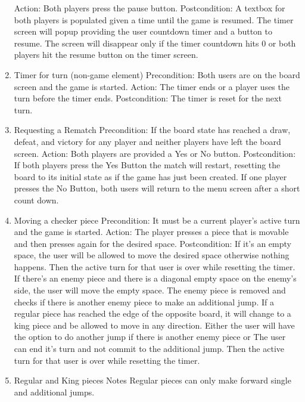 \documentclass[10pt]{article}
\begin{document}
\begin{enumerate}
        \subitem Action: Both players press the pause button.
        \subitem Postcondition: A textbox for both players is populated given a time until the game is resumed. The timer screen will popup providing the user countdown timer and a button to resume. The screen will disappear only if the timer countdown hits 0 or both players hit the resume button on the timer screen.
    \item Timer for turn (non-game element)
        \subitem Precondition: Both users are on the board screen and the game is started.
        \subitem Action: The timer ends or a player uses the turn before the timer ends.
        \subitem Postcondition: The timer is reset for the next turn.
    \item Requesting a Rematch
        \subitem Precondition: If the board state has reached a draw, defeat, and victory for any player and neither players have left the board screen.
        \subitem Action: Both players are provided a Yes or No button.
        \subitem Postcondition:
            \subsubitem If both players press the Yes Button the match will restart, resetting the board to its initial state as if the game has just been created.
            \subsubitem If one player presses the No Button, both users will return to the menu screen after a short count down.
    \item Moving a checker piece
        \subitem Precondition: It must be a current player’s active turn and the game is started.
        \subitem Action: The player presses a piece that is movable and then presses again for the desired space.
        \subitem Postcondition:
            \subsubitem If it’s an empty space, the user will be allowed to move the desired space otherwise nothing happens. Then the active turn for that user is over while resetting the timer.
            \subsubitem If there’s an enemy piece and there is a diagonal empty space on the enemy’s side, the user will move the empty space. The enemy piece is removed and checks if there is another enemy piece to make an additional jump.
            \subsubitem If a regular piece has reached the edge of the opposite board, it will change to a king piece and be allowed to move in any direction. Either the user will have the option to do another jump if there is another enemy piece or The user can end it’s turn and not commit to the additional jump.
        \subitem Then the active turn for that user is over while resetting the timer.
    \item Regular and King pieces Notes
        \subitem Regular pieces can only make forward single and additional jumps.

\end{enumerate}
\end{document}
